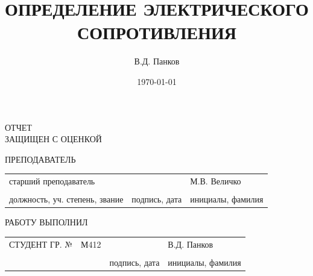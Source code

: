 \documentclass[14pt]{extarticle}
\author{В.Д. Панков}
\date{\today}
\title{ОПРЕДЕЛЕНИЕ ЭЛЕКТРИЧЕСКОГО СОПРОТИВЛЕНИЯ}
\begin{document}
\begin{small}
\begin{titlepage}

\linespread{1}\selectfont{}

\vspace{32pt}


\vspace{60pt}

\raggedright{ОТЧЕТ \\
ЗАЩИЩЕН С ОЦЕНКОЙ}
\vspace{14pt}

\raggedright{ПРЕПОДАВАТЕЛЬ}

\vspace{12pt}

\begin{tabularx}{\textwidth}{ >{\centering\arraybackslash}X >{\centering\arraybackslash}X >{\centering\arraybackslash}X }
	 старший преподаватель & & М.В. Величко \\ 
	 \hrulefill & \hrulefill & \hrulefill \\ 
\footnotesize{должность, уч. степень, звание} & \footnotesize{подпись, дата} & \footnotesize{инициалы, фамилия} \\ 
\end{tabularx} 
 
\vspace{48pt} 


\vspace{40pt} 


\vspace{40pt} 


\vspace*{\fill} 

\raggedright{РАБОТУ ВЫПОЛНИЛ} 

\vspace{10pt} 

\begin{tabularx}{\textwidth}{>{\raggedright\arraybackslash}X  >{\centering\arraybackslash}X >{\centering\arraybackslash}X >{\centering\arraybackslash}X }
СТУДЕНТ ГР. № & М412 & & В.Д. Панков \\ 
	 & \hrulefill & \hrulefill & \hrulefill \\ 
	 &  & \footnotesize{подпись, дата} & \footnotesize{инициалы, фамилия} \\ 
\end{tabularx} 
 
\vspace*{\fill} 


\end{titlepage}
\end{small}
\end{document}
